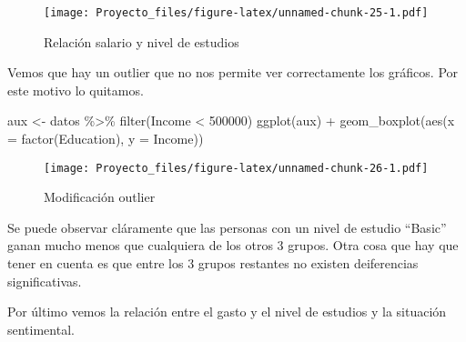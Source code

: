 \documentclass[
]{article}
\newenvironment{Shaded}{\begin{snugshade}}{\end{snugshade}}
\newcommand{\AttributeTok}[1]{\textcolor[rgb]{0.77,0.63,0.00}{#1}}
\newcommand{\DecValTok}[1]{\textcolor[rgb]{0.00,0.00,0.81}{#1}}
\newcommand{\FunctionTok}[1]{\textcolor[rgb]{0.00,0.00,0.00}{#1}}
\newcommand{\NormalTok}[1]{#1}
\newcommand{\OtherTok}[1]{\textcolor[rgb]{0.56,0.35,0.01}{#1}}
\newcommand{\SpecialCharTok}[1]{\textcolor[rgb]{0.00,0.00,0.00}{#1}}
\begin{document}
\begin{figure}
\centering
\texttt{[image: Proyecto\_files/figure-latex/unnamed-chunk-25-1.pdf]}
\caption{Relación salario y nivel de estudios}
\end{figure}

Vemos que hay un outlier que no nos permite ver correctamente los
gráficos. Por este motivo lo quitamos.

\begin{Shaded}
\begin{Highlighting}[]
\NormalTok{aux }\OtherTok{\textless{}{-}}\NormalTok{ datos }\SpecialCharTok{\%\textgreater{}\%}
  \FunctionTok{filter}\NormalTok{(Income }\SpecialCharTok{\textless{}} \DecValTok{500000}\NormalTok{)}
\FunctionTok{ggplot}\NormalTok{(aux) }\SpecialCharTok{+}
  \FunctionTok{geom\_boxplot}\NormalTok{(}\FunctionTok{aes}\NormalTok{(}\AttributeTok{x =} \FunctionTok{factor}\NormalTok{(Education), }\AttributeTok{y =}\NormalTok{ Income))}
\end{Highlighting}
\end{Shaded}

\begin{figure}
\centering
\texttt{[image: Proyecto\_files/figure-latex/unnamed-chunk-26-1.pdf]}
\caption{Modificación outlier}
\end{figure}

Se puede observar cláramente que las personas con un nivel de estudio
``Basic'' ganan mucho menos que cualquiera de los otros 3 grupos. Otra
cosa que hay que tener en cuenta es que entre los 3 grupos restantes no
existen deiferencias significativas.

Por último vemos la relación entre el gasto y el nivel de estudios y la
situación sentimental.
\end{document}
